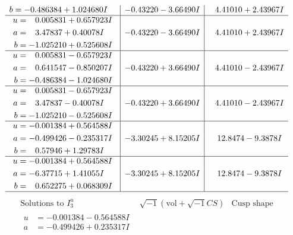 \documentclass[1p]{elsarticle_modified}
\theoremstyle{definition}
\newcommand{\I}{\sqrt{-1}}
\begin{document}
$$\begin{array}{c|c|c}
\begin{aligned}
b &= -0.486384 + 1.024680 I\end{aligned}
 & -0.43220 - 3.66490 I & \phantom{-}4.41010 + 2.43967 I \\ \hline\begin{aligned}
u &= \phantom{-}0.005831 + 0.657923 I \\
a &= \phantom{-}3.47837 + 0.40078 I \\
b &= -1.025210 + 0.525608 I\end{aligned}
 & -0.43220 - 3.66490 I & \phantom{-}4.41010 + 2.43967 I \\ \hline\begin{aligned}
u &= \phantom{-}0.005831 - 0.657923 I \\
a &= \phantom{-}0.641547 - 0.850207 I \\
b &= -0.486384 - 1.024680 I\end{aligned}
 & -0.43220 + 3.66490 I & \phantom{-}4.41010 - 2.43967 I \\ \hline\begin{aligned}
u &= \phantom{-}0.005831 - 0.657923 I \\
a &= \phantom{-}3.47837 - 0.40078 I \\
b &= -1.025210 - 0.525608 I\end{aligned}
 & -0.43220 + 3.66490 I & \phantom{-}4.41010 - 2.43967 I \\ \hline\begin{aligned}
u &= -0.001384 + 0.564588 I \\
a &= -0.499426 - 0.235317 I \\
b &= \phantom{-}0.57946 + 1.29783 I\end{aligned}
 & -3.30245 + 8.15205 I & \phantom{-}12.8474 - 9.3878 I \\ \hline\begin{aligned}
u &= -0.001384 + 0.564588 I \\
a &= -6.37715 + 1.41055 I \\
b &= \phantom{-}0.652275 + 0.068309 I\end{aligned}
 & -3.30245 + 8.15205 I & \phantom{-}12.8474 - 9.3878 I\\
 \hline 
 \end{array}$$\newpage$$\begin{array}{c|c|c}  
\text{Solutions to }I^u_{3}& \I (\text{vol} + \sqrt{-1}CS) & \text{Cusp shape}\\
 \hline 
\begin{aligned}
u &= -0.001384 - 0.564588 I \\
a &= -0.499426 + 0.235317 I \\

\end{aligned}
\end{array}$$
\end{document}
